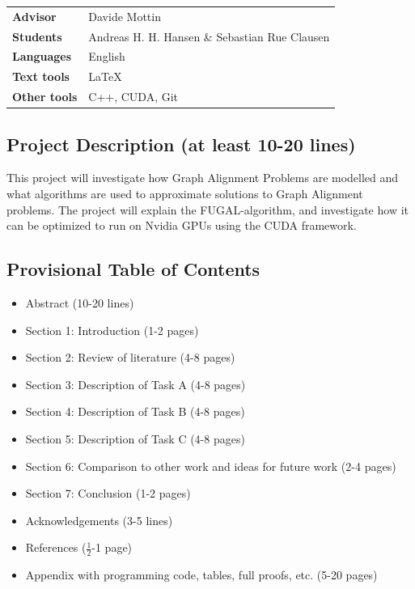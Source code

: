 \documentclass{article}
\begin{document}
\pagestyle{fancy}

\bgroup{}
\begin{table}[h]
\begin{tabular}{ll}
\textbf{Advisor}     & Davide Mottin \\
\textbf{Students}    & Andreas H. H. Hansen \& Sebastian Rue Clausen \\
\textbf{Languages}   & English \\
\textbf{Text tools}  & \LaTeX         \\
\textbf{Other tools} & C++, CUDA, Git      
\end{tabular}
\end{table}
\egroup\vspace{-0.cm}

\subsection*{Project Description (at least 10-20 lines)}

This project will investigate how Graph Alignment Problems are modelled and what algorithms are used to approximate solutions to Graph Alignment problems. The project will explain the FUGAL-algorithm, and investigate how it can be optimized to run on Nvidia GPUs using the CUDA framework. 

\subsection*{Provisional Table of Contents}
\begin{itemize}
    \item Abstract (10-20 lines)
    \item Section 1: Introduction (1-2 pages)
    \item Section 2: Review of literature (4-8 pages)
    \item Section 3: Description of Task A (4-8 pages)
    \item Section 4: Description of Task B (4-8 pages)
    \item Section 5: Description of Task C (4-8 pages)
    \item Section 6: Comparison to other work and ideas for future work (2-4 pages)
    \item Section 7: Conclusion (1-2 pages)
    \item Acknowledgements (3-5 lines)
    \item References ($\frac{1}{2}$-1 page)
    \item Appendix with programming code, tables, full proofs, etc. (5-20 pages)
\end{itemize}
\end{document}
